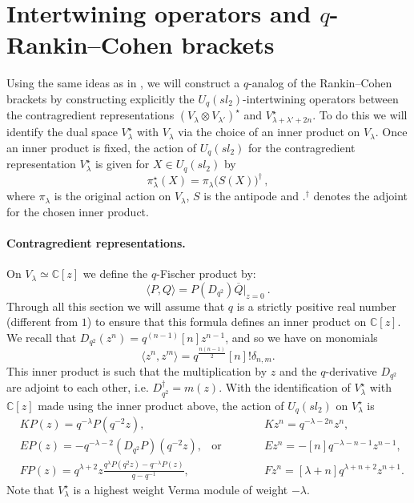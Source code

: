 \documentclass[a4paper,12pt]{article}
\numberwithin{equation}{section}
\newcommand{\C}{\mathbb{C}}
\theoremstyle{rem}
\newenvironment{rema}
  {\pushQED{\qed}\renewcommand{\qedsymbol}{$\scriptstyle{\blacktriangle}$}\remax}
  {\popQED\endremax}
\theoremstyle{definition}
\begin{document}
\section{Intertwining operators and $q$-Rankin--Cohen brackets}\label{sec5}


Using the same ideas as in \cite{LabrietPoulain24}, we will construct a $q$-analog of the Rankin--Cohen brackets by constructing explicitly the $U_q(sl_2)$-intertwining operators between the contragredient representations  $\left( V_\lambda \otimes V_{\lambda'}\right)^\star$ and $V_{\lambda+\lambda'+2n}^\star$. To do this we will identify the dual space $V_\lambda^\star$ with $V_\lambda$ via the choice of an inner product on $V_\lambda$. Once an inner product is fixed, the action of $U_q(sl_2)$ for the contragredient representation $V_\lambda^\star$ is given for $X\in U_q(sl_2)$ by 
$$\pi_{\lambda}^{\star}(X)=\pi_{\lambda}\bigl(S(X)\bigr)^{\dagger}\,,$$
where $\pi_{\lambda}$ is the original action on $V_{\lambda}$, $S$ is the antipode and $.^\dagger$ denotes the adjoint for the chosen inner product.  

\paragraph{Contragredient representations.} On $V_\lambda\simeq \C[z]$ we define the $q$-Fischer product by:
\[\langle P,Q\rangle=P(D_{q^2})\overline{Q}|_{z=0}\ .\]
Through all this section we will assume that $q$ is a strictly positive real number (different from $1$) to ensure that this formula defines an inner product on $\C[z]$. We recall that $D_{q^2}(z^n)=q^{(n-1)}[n]z^{n-1}$, and so we have on monomials
\[ \langle z^n,z^m\rangle =q^{\frac{n(n-1)}{2}}[n]! \delta_{n,m}.\]
\begin{rema}
This inner product is such that the multiplication by $z$ and the $q$-derivative $D_{q^2}$ are adjoint to each other, i.e. $D_{q^2}^\dagger=m(z)$.  
\end{rema}
With the identification of $V_{\lambda}^{\star}$ with $\mathbb{C}[z]$ made using the inner product above, the action of $U_q(sl_2)$ on $V_{\lambda}^{\star}$ is
\begin{align}
    &KP(z)= q^{-\lambda}P(q^{-2}z), & & Kz^n=q^{-\lambda-2n}z^n,&\label{action_contragredientK}\\
    &EP(z)=-q^{-\lambda-2}\left(D_{q^2}P\right)(q^{-2}z), & \text{or}\qquad\quad & Ez^n=-[n]q^{-\lambda-n-1}z^{n-1},&\label{action_contragredientE}\\
    &FP(z)= q^{\lambda+2}z\frac{q^\lambda P(q^2z)-q^{-\lambda}P(z)}{q-q^{-1}}, & & Fz^n=[\lambda+n]q^{\lambda+n+2}z^{n+1}.& \label{action_contragredientF}
\end{align}
Note that $V_{\lambda}^{\star}$ is a highest weight Verma module of weight $-\lambda$.
\end{document}
